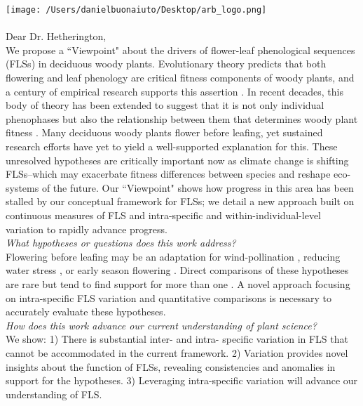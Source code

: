 \documentclass[11pt,a4paper]{article}
\begin{document}

\def\labelitemi{--}
\parindent=24pt
\texttt{[image: /Users/danielbuonaiuto/Desktop/arb\_logo.png]}
\\\\
{Dear Dr. Hetherington,}\\

\noindent We propose a ``Viewpoint" about the drivers of flower-leaf phenological sequences (FLSs) in deciduous woody plants. Evolutionary theory predicts that both flowering and leaf phenology are critical fitness components of woody plants, and a century of empirical research supports this assertion \citep{Munguia-Rosas2011,Forrest2010}. In recent decades, this body of theory has been extended to suggest that it is not only individual phenophases but also the relationship between them that determines woody plant fitness \citep{Menzel1999,Ettinger2018}. Many deciduous woody plants flower before leafing, yet sustained research efforts have yet to yield a well-supported explanation for this. These unresolved hypotheses are critically important now as climate change is shifting FLSs--which may exacerbate fitness differences between species and reshape eco-systems of the future. Our ``Viewpoint" shows how progress in this area has been stalled by our conceptual framework for FLSs; we detail a new approach built on continuous measures of FLS and intra-specific and within-individual-level variation to rapidly advance progress.\\

\noindent \emph{What hypotheses or questions does this work address?}\\

\noindent Flowering before leafing may be an adaptation for wind-pollination \citep{Rathcke_1985}, reducing water stress \citep{Reich1984}, or early season flowering \citep{Primack1987}. Direct comparisons of these hypotheses are rare but tend to find support for more than one \citep{Gougherty2018,Bolmgren2003}. A novel approach focusing on intra-specific FLS variation and quantitative comparisons is necessary to accurately evaluate these hypotheses.\\

\noindent \emph{How does this work advance our current understanding of plant science?}\\

\noindent We show: 1) There is substantial inter- and intra- specific variation in FLS that cannot be accommodated in the current framework. 2) Variation provides novel insights about the function of FLSs, revealing consistencies and anomalies in support for the hypotheses. 3) Leveraging intra-specific variation will advance our understanding of FLS.\\
\end{document}
